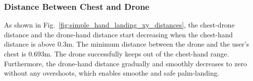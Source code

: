 \subsubsection{Distance Between Chest and Drone}
As shown in Fig.~\ref{fig:simple_hand_landing_xy_distances}, the chest-drone distance and the drone-hand distance start decreasing 
when the chest-hand distance is above 0.3m.
The minimum distance between the drone and the user's chest is 0.693m.
The drone successfully keeps out of the chest-hand range.
Furthermore, the drone-hand distance gradually and smoothly decreases to zero without any overshoots,
which enables smoothe and safe palm-landing.